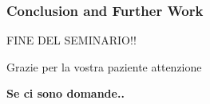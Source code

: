 
		
		







\begin{frame}
	\frametitle{Conclusion and Further Work}
	\addtocounter{nframe}{1}
	\begin{block}{FINE DEL SEMINARIO!!}
		\begin{center}
			Grazie per la vostra paziente attenzione
		\end{center}
		\begin{center}
			\textbf{Se ci sono domande..}
		\end{center}
	\end{block}
\end{frame}

